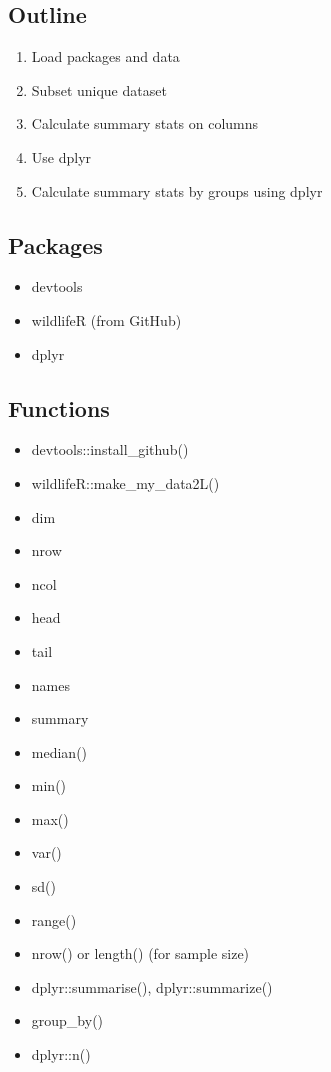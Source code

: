 \documentclass[]{book}
\providecommand{\tightlist}{%
  \setlength{\itemsep}{0pt}\setlength{\parskip}{0pt}}
\theoremstyle{definition}
\theoremstyle{definition}
\theoremstyle{definition}
\theoremstyle{remark}
\begin{document}
\subsection{Outline}\label{outline-2}

\begin{enumerate}
\def\labelenumi{\arabic{enumi}.}
\tightlist
\item
  Load packages and data
\item
  Subset unique dataset
\item
  Calculate summary stats on columns
\item
  Use dplyr
\item
  Calculate summary stats by groups using dplyr
\end{enumerate}

\subsection{Packages}\label{packages-7}

\begin{itemize}
\tightlist
\item
  devtools
\item
  wildlifeR (from GitHub)
\item
  dplyr
\end{itemize}

\subsection{Functions}\label{functions-1}

\begin{itemize}
\tightlist
\item
  devtools::install\_github()
\item
  wildlifeR::make\_my\_data2L()
\item
  dim
\item
  nrow
\item
  ncol
\item
  head
\item
  tail
\item
  names
\item
  summary
\item
  median()
\item
  min()
\item
  max()
\item
  var()
\item
  sd()
\item
  range()
\item
  nrow() or length() (for sample size)
\item
  dplyr::summarise(), dplyr::summarize()
\item
  group\_by()
\item
  dplyr::n()
\end{itemize}
\end{document}
